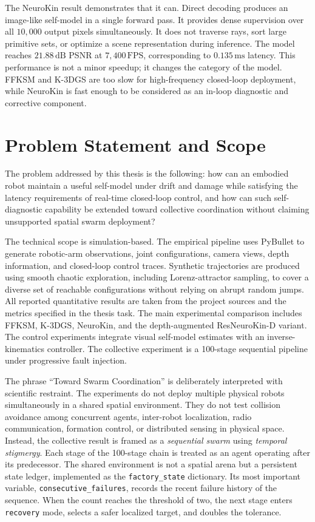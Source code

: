\documentclass[12pt,a4paper,oneside]{report}
\begin{document}
The NeuroKin result demonstrates that it can. Direct decoding produces an image-like self-model in a single forward pass. It provides dense supervision over all $10{,}000$ output pixels simultaneously. It does not traverse rays, sort large primitive sets, or optimize a scene representation during inference. The model reaches $21.88\,\mathrm{dB}$ PSNR at $7{,}400\,\mathrm{FPS}$, corresponding to $0.135\,\mathrm{ms}$ latency. This performance is not a minor speedup; it changes the category of the model. FFKSM and K-3DGS are too slow for high-frequency closed-loop deployment, while NeuroKin is fast enough to be considered as an in-loop diagnostic and corrective component.

\section{Problem Statement and Scope}

The problem addressed by this thesis is the following: how can an embodied robot maintain a useful self-model under drift and damage while satisfying the latency requirements of real-time closed-loop control, and how can such self-diagnostic capability be extended toward collective coordination without claiming unsupported spatial swarm deployment?

The technical scope is simulation-based. The empirical pipeline uses PyBullet to generate robotic-arm observations, joint configurations, camera views, depth information, and closed-loop control traces. Synthetic trajectories are produced using smooth chaotic exploration, including Lorenz-attractor sampling, to cover a diverse set of reachable configurations without relying on abrupt random jumps. All reported quantitative results are taken from the project sources and the metrics specified in the thesis task. The main experimental comparison includes FFKSM, K-3DGS, NeuroKin, and the depth-augmented ResNeuroKin-D variant. The control experiments integrate visual self-model estimates with an inverse-kinematics controller. The collective experiment is a 100-stage sequential pipeline under progressive fault injection.

The phrase ``Toward Swarm Coordination'' is deliberately interpreted with scientific restraint. The experiments do not deploy multiple physical robots simultaneously in a shared spatial environment. They do not test collision avoidance among concurrent agents, inter-robot localization, radio communication, formation control, or distributed sensing in physical space. Instead, the collective result is framed as a \emph{sequential swarm} using \emph{temporal stigmergy}. Each stage of the 100-stage chain is treated as an agent operating after its predecessor. The shared environment is not a spatial arena but a persistent state ledger, implemented as the \texttt{factory\_state} dictionary. Its most important variable, \texttt{consecutive\_failures}, records the recent failure history of the sequence. When the count reaches the threshold of two, the next stage enters \texttt{recovery} mode, selects a safer localized target, and doubles the tolerance.
\end{document}
